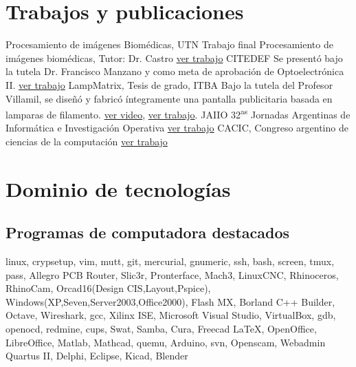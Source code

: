 \documentclass[11pt,a4paper,sans]{moderncv} 	%
\begin{document}
\section{Trabajos y publicaciones}
 														{Procesamiento de imágenes Biomédicas, UTN} 							{}{}{Trabajo final Procesamiento de imágenes biomédicas, Tutor: Dr. Castro 								\href{http://disenioconingenio.com.ar/shop/docs/Final_ooffice.pdf} 								{ver trabajo}}
 										{CITEDEF} 											{}{}{Se presentó bajo la tutela Dr. Francisco Manzano y como meta de aprobación de Optoelectrónica II. 					\href{http://disenioconingenio.com.ar/shop/docs/citedef_2008.pdf} 								{ver trabajo}}
 		{LampMatrix, Tesis de grado, ITBA} 								{}{}{Bajo la tutela del Profesor Villamil, se diseñó y fabricó íntegramente una pantalla publicitaria basada en lamparas de filamento. 	\href{http://www.youtube.com/watch?v=Usx4YUNpknc}{ver video}, \href{http://disenioconingenio.com.ar/shop/docs/lampmatrix.pdf} 	{ver trabajo}.}
 					{JAIIO 32\textsuperscript{as} Jornadas Argentinas de Informática e Investigación Operativa} 	{}{}																	{\href{http://disenioconingenio.com.ar/shop/docs/jaiio2003.pdf} 								{ver trabajo}}
 								{CACIC, Congreso argentino de ciencias de la computación} 					{}{} 																	{\href{http://disenioconingenio.com.ar/shop/docs/cacic2003.pdf} 								{ver trabajo}}
\section{Dominio de tecnologías}
	\subsection{Programas de computadora destacados}
	 	{linux, crypsetup, vim, mutt, git, mercurial, gnumeric, ssh, bash, screen, tmux, pass, Allegro PCB Router, Slic3r, Pronterface, Mach3, LinuxCNC, Rhinoceros, RhinoCam, Orcad16(Design CIS,Layout,Pspice), Windows(XP,Seven,Server2003,Office2000), Flash MX, Borland C++ Builder, Octave, Wireshark, gcc, Xilinx ISE, Microsoft Visual Studio, VirtualBox, gdb, openocd, redmine, cups, Swat, Samba, Cura, Freecad}
	 	{\LaTeX, OpenOffice, LibreOffice, Matlab, Mathcad, quemu, Arduino, svn, Openscam, Webadmin}
	 	{Quartus II, Delphi, Eclipse, Kicad, Blender}
\end{document}

